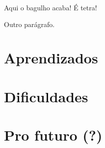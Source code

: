 
Aqui o bagulho acaba! É tetra!

Outro parágrafo.

\section{Aprendizados}
\section{Dificuldades}
\section{Pro futuro (?)}